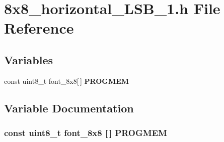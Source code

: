 \section{8x8\_\-horizontal\_\-LSB\_\-1.h File Reference}
\label{8x8__horizontal__LSB__1_8h}
\subsection*{Variables}
\begin{CompactItemize}
\item 
const uint8\_\-t font\_\-8x8[$\,$] {\bf PROGMEM}
\end{CompactItemize}


\subsection{Variable Documentation}
\subsubsection{\setlength{\rightskip}{0pt plus 5cm}const uint8\_\-t font\_\-8x8 [$\,$] {\bf PROGMEM}}\label{8x8__horizontal__LSB__1_8h_ba6ccc96f4d96e2e7f9062a7a72b4766}


